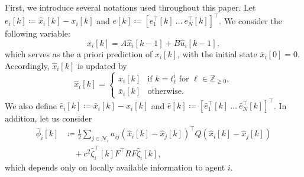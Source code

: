 \documentclass[letterpaper,10pt,conference]{ieeeconf}
\newcommand{\Z}{\mathbb{Z}}
\begin{document}
First, we introduce several notations used throughout this paper.
Let $e_i[k] \coloneqq \hat{x}_i[k] - x_i[k]$ and $e[k] \coloneqq [e_1^\top[k]\ \dots\ e_N^\top[k]]^\top$.
We consider the following variable:
\begin{equation} \label{eq:apriori_estimation}
  \bar{x}_i[k] = A\hat{x}_i[k-1] + B\hat{u}_i[k-1],
\end{equation}
which serves as the a priori prediction of $x_i[k]$, with the initial state $\bar{x}_i[0] = 0$.
Accordingly, $\hat{x}_i[k]$ is updated by
\begin{equation}
  \hat{x}_i[k] = \begin{cases}
    x_i[k] & \text{if $k = t^i_\ell$ for $\ell \in \Z_{\geq 0}$},\\
    \bar{x}_i[k] & \text{otherwise}.
  \end{cases}
\end{equation}
We also define $\bar{e}_i[k] \coloneqq \bar{x}_i[k] - x_i[k]$ and $\bar{e}[k] \coloneqq [\bar{e}_1^\top[k]\ \dots\ \bar{e}_N^\top[k]]^\top$.
In addition, let us consider
\begin{align}
  \hat\phi_i[k]
  &\coloneqq
  \frac{1}{2}\sum_{j\in\mathcal N_i} a_{ij}
  \left(\hat{x}_i[k]-\hat{x}_j[k]\right)^\top Q \left(\hat{x}_i[k]-\hat{x}_j[k]\right) \\
  &\quad +
  c^2 \hat{\zeta}_i^\top[k] F^\top R F \hat{\zeta}_i[k], \label{eq:def_phi}
\end{align}
which depends only on locally available information to agent $i$.
\end{document}
